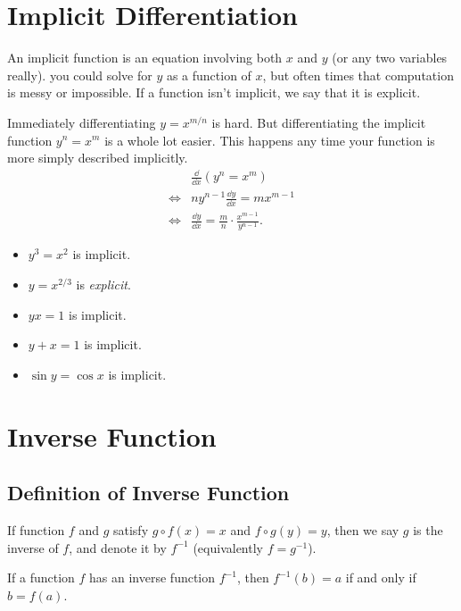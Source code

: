 \section{Implicit Differentiation}
\begin{note} An implicit function is an equation involving both $x$ and $y$ (or any two variables really). you could solve for $y$ as a function of $x$, but often times that computation is messy or impossible. If a function isn't implicit, we say that it is explicit.
\end{note}

Immediately differentiating $y=x^{m/n}$ is hard. But differentiating the implicit function $y^n=x^m$ is a whole lot easier. This happens any time your function is more simply described implicitly.
\begin{align*}
  \phantom{\iff{}} & \frac{\dd }{\dd x}(y^n=x^m)\\
            \iff{} & ny^{n-1}\frac{\dd y}{\dd x}=mx^{m-1}\\
            \iff{} & \frac{\dd y}{\dd x}=\frac m n\cdot\frac{x^{m-1}}{y^{n-1}}.
\end{align*}
\begin{eg}
  \leavevmode
  \begin{itemize}
    \item$y^3=x^2$ is implicit.
    \item$y=x^{2/3}$ is \textit{explicit}.
    \item$yx=1$ is implicit.
    \item$y+x=1$ is implicit.
    \item$\sin y=\cos x$ is implicit.
  \end{itemize}
\end{eg}

\section{Inverse Function}
\subsection{Definition of Inverse Function}
If function $f$ and $g$ satisfy $g\circ f(x)=x$ and $f\circ g(y)=y$, then we say $g$ is the inverse of $f$, and denote it by $f^{-1}$ (equivalently $f=g^{-1}$). 

If a function $f$ has an inverse function $f^{-1}$, then $f^{-1}(b)=a$ if and only if $b=f(a)$.

